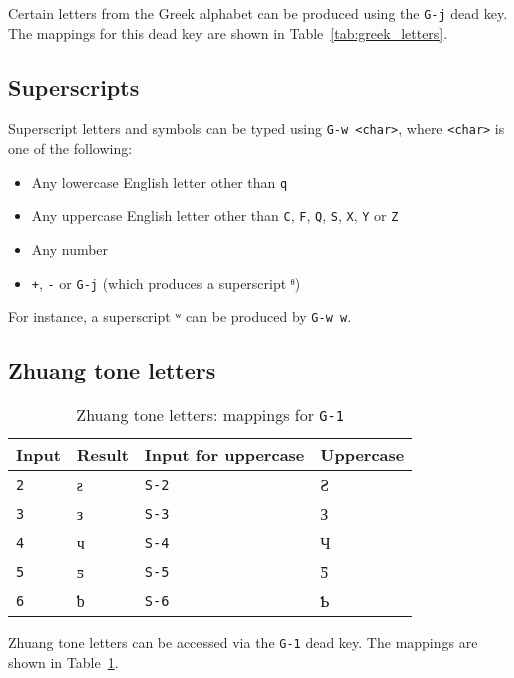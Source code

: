 \documentclass[oneside]{memoir}
\newcommand{\key}{\verb}
\newcommand{\keynv}{\texttt}
\newcommand{\out}[1]{\colorbox{gray!20}{#1}}
\begin{document}
Certain letters from the Greek alphabet can be produced using the \key|G-j| dead key.
The mappings for this dead key are shown in Table~\ref{tab:greek_letters}.

\subsection{Superscripts}
\label{sec:superscripts}

Superscript letters and symbols can be typed using \key|G-w <char>|, where \key|<char>| is one of the following:
\begin{itemize}[noitemsep]
\item Any lowercase English letter other than \key|q|
\item Any uppercase English letter other than \key|C|, \key|F|, \key|Q|, \key|S|, \key|X|, \key|Y| or \key|Z|
\item Any number
\item \key|+|, \key|-| or \key|G-j| (which produces a superscript \out{ᶿ})
\end{itemize}
For instance, a superscript \out{ʷ} can be produced by \key|G-w w|.

\subsection{Zhuang tone letters}
\label{sec:zhuang_tones}

\begin{table}[b]
\caption{Zhuang tone letters: mappings for \keynv{G-1}}
\label{tab:zhuang_tones}
\centering
\begin{tabular}{llll}
\toprule
Input & Result & Input for uppercase & Uppercase \\
\midrule
\key|2| & ƨ & \key|S-2| & Ƨ \\
\key|3| & з & \key|S-3| & З \\
\key|4| & ч & \key|S-4| & Ч \\
\key|5| & ƽ & \key|S-5| & Ƽ \\
\key|6| & ƅ & \key|S-6| & Ƅ \\
\end{tabular}
\end{table}

Zhuang tone letters can be accessed via the \key|G-1| dead key.
The mappings are shown in Table~\ref{tab:zhuang_tones}.
\end{document}
